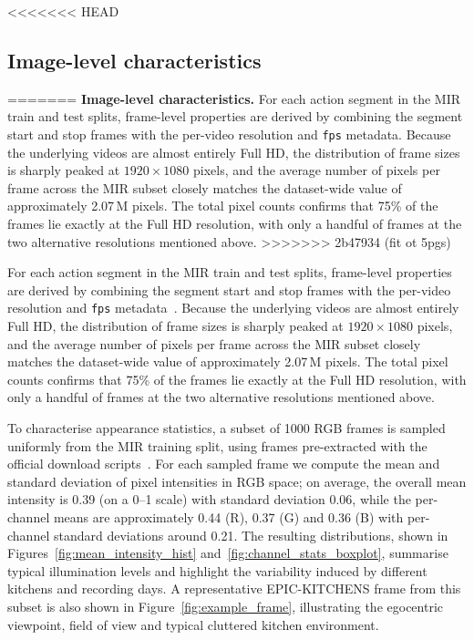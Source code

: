 <<<<<<< HEAD

\subsection{Image-level characteristics}

=======
\textbf{Image-level characteristics.} For each action segment in the MIR train and test splits, frame-level properties are derived by combining the segment start and stop frames with the per-video resolution and \texttt{fps} metadata. Because the underlying videos are almost entirely Full HD, the distribution of frame sizes is sharply peaked at \(1920\times1080\) pixels, and the average number of pixels per frame across the MIR subset closely matches the dataset-wide value of approximately 2.07\,M pixels. The total pixel counts confirms that 75\% of the frames lie exactly at the Full HD resolution, with only a handful of frames at the two alternative resolutions mentioned above.
>>>>>>> 2b47934 (fit ot 5pgs)

For each action segment in the MIR train and test splits, frame-level properties are derived by combining the segment start and stop frames with the per-video resolution and \texttt{fps} metadata~\cite{damen2022rescaling}. Because the underlying videos are almost entirely Full HD, the distribution of frame sizes is sharply peaked at \(1920\times1080\) pixels, and the average number of pixels per frame across the MIR subset closely matches the dataset-wide value of approximately 2.07\,M pixels. The total pixel counts confirms that 75\% of the frames lie exactly at the Full HD resolution, with only a handful of frames at the two alternative resolutions mentioned above.


To characterise appearance statistics, a subset of 1000 RGB frames is sampled uniformly from the MIR training split, using frames pre-extracted with the official download scripts~\cite{damen2022rescaling}. For each sampled frame we compute the mean and standard deviation of pixel intensities in RGB space; on average, the overall mean intensity is 0.39 (on a 0--1 scale) with standard deviation 0.06, while the per-channel means are approximately 0.44 (R), 0.37 (G) and 0.36 (B) with per-channel standard deviations around 0.21. The resulting distributions, shown in Figures~\ref{fig:mean_intensity_hist} and~\ref{fig:channel_stats_boxplot}, summarise typical illumination levels and highlight the variability induced by different kitchens and recording days. A representative EPIC-KITCHENS frame from this subset is also shown in Figure~\ref{fig:example_frame}, illustrating the egocentric viewpoint, field of view and typical cluttered kitchen environment.


